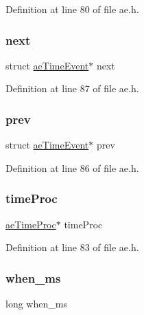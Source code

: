 Definition at line 80 of file ae.\+h.

\mbox{\label{structae_time_event_a9210aa4aa97ad7cba5770e567b8fd961}} 
\subsubsection{\texorpdfstring{next}{next}}
{\footnotesize\ttfamily struct \hyperlink{structae_time_event}{ae\+Time\+Event}$\ast$ next}



Definition at line 87 of file ae.\+h.

\mbox{\label{structae_time_event_ada581f66d2dd621d24aaba80b0d36ad8}} 
\subsubsection{\texorpdfstring{prev}{prev}}
{\footnotesize\ttfamily struct \hyperlink{structae_time_event}{ae\+Time\+Event}$\ast$ prev}



Definition at line 86 of file ae.\+h.

\mbox{\label{structae_time_event_a93b11f52b154bc10722b6d0e69acc9fb}} 
\subsubsection{\texorpdfstring{time\+Proc}{timeProc}}
{\footnotesize\ttfamily \hyperlink{ae_8h_a09cb08f0aea5e5c1460a8b8599d789c8}{ae\+Time\+Proc}$\ast$ time\+Proc}



Definition at line 83 of file ae.\+h.

\mbox{\label{structae_time_event_a416251c056e9c8a78fa667370f2cd30c}} 
\subsubsection{\texorpdfstring{when\+\_\+ms}{when\_ms}}
{\footnotesize\ttfamily long when\+\_\+ms}



